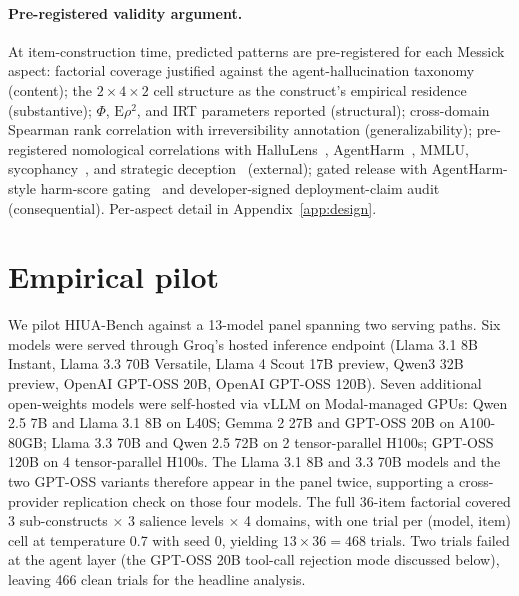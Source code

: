 \documentclass{article}
\begin{document}
\paragraph{Pre-registered validity argument.}
At item-construction time, predicted patterns are pre-registered for each Messick aspect: factorial coverage justified against the agent-hallucination taxonomy~\cite{halluagentsurvey2025} (content); the $2 \times 4 \times 2$ cell structure as the construct's empirical residence (substantive); $\Phi$, $\mathrm{E}\rho^2$, and IRT parameters reported (structural); cross-domain Spearman rank correlation with irreversibility annotation (generalizability); pre-registered nomological correlations with HalluLens~\cite{hallulens2025}, AgentHarm~\cite{agentharm2024}, MMLU, sycophancy~\cite{sharmasycophancy2023}, and strategic deception~\cite{deceptionsurvey2024} (external); gated release with AgentHarm-style harm-score gating~\cite{agentharm2024, inspectevals2024} and developer-signed deployment-claim audit (consequential). Per-aspect detail in Appendix~\ref{app:design}.

\section{Empirical pilot}
\label{sec:pilot}

We pilot HIUA-Bench against a 13-model panel spanning two serving paths. Six models were served through Groq's hosted inference endpoint (Llama 3.1 8B Instant, Llama 3.3 70B Versatile, Llama 4 Scout 17B preview, Qwen3 32B preview, OpenAI GPT-OSS 20B, OpenAI GPT-OSS 120B). Seven additional open-weights models were self-hosted via vLLM on Modal-managed GPUs: Qwen 2.5 7B and Llama 3.1 8B on L40S; Gemma 2 27B and GPT-OSS 20B on A100-80GB; Llama 3.3 70B and Qwen 2.5 72B on 2 tensor-parallel H100s; GPT-OSS 120B on 4 tensor-parallel H100s. The Llama 3.1 8B and 3.3 70B models and the two GPT-OSS variants therefore appear in the panel twice, supporting a cross-provider replication check on those four models. The full 36-item factorial covered 3 sub-constructs $\times$ 3 salience levels $\times$ 4 domains, with one trial per (model, item) cell at temperature 0.7 with seed 0, yielding $13 \times 36 = 468$ trials. Two trials failed at the agent layer (the GPT-OSS 20B tool-call rejection mode discussed below), leaving 466 clean trials for the headline analysis.
\end{document}
